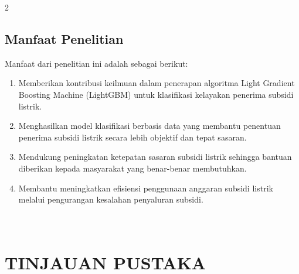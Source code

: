 \documentclass[12pt, a4paper, onecolumn, oneside]{report}
\begin{document}
\begin{spacing}{2}
\section{Manfaat Penelitian}
Manfaat dari penelitian ini adalah sebagai berikut:
\begin{enumerate}
    \item Memberikan kontribusi keilmuan dalam penerapan algoritma Light Gradient Boosting Machine (LightGBM) untuk klasifikasi kelayakan penerima subsidi listrik.
    \item Menghasilkan model klasifikasi berbasis data yang membantu penentuan penerima subsidi listrik secara lebih objektif dan tepat sasaran.
    \item Mendukung peningkatan ketepatan sasaran subsidi listrik sehingga bantuan diberikan kepada masyarakat yang benar-benar membutuhkan.
    \item Membantu meningkatkan efisiensi penggunaan anggaran subsidi listrik melalui pengurangan kesalahan penyaluran subsidi.
\\
\end{enumerate}
\chapter[TINJAUAN PUSTAKA]{\\ TINJAUAN PUSTAKA}


\end{spacing}
\end{document}
